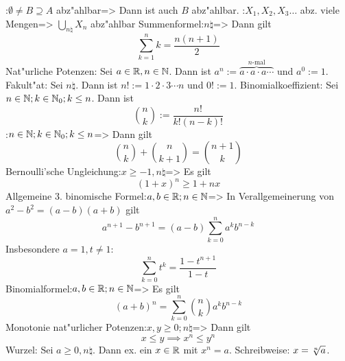 \theorem:$\emptyset\ne B\supseteq A$ abz"ahlbar=>{
  Dann ist auch $B$ abz"ahlbar.
  }
\theorem:$X_1,X_2,X_3\ldots$ abz. viele Mengen=>{
  $\bigcup\limits_{n\natural} X_n$ abz"ahlbar
  }
\theorem Summenformel:$n\natural$=>{
  Dann gilt
  \[\sum_{k=1}^n k=\frac{n(n+1)}2
    \]
  }
 Nat"urliche Potenzen:{
  Sei $a\in\mathbb R,n\in\mathbb N$.
  Dann ist $a^n:=\overbrace{a\cdot a\cdot a\cdots}^{n\text{-mal}}$ und $a^0:=1$.
}
 Fakult"at:{
  Sei $n\natural$. Dann ist $n!:=1\cdot 2\cdot 3\cdots n$ und $0!:=1$.
}
 Binomialkoeffizient:{
  Sei $n\in\mathbb N;k\in\mathbb N_0;k\le n$. Dann ist 
  \[\binom n k :=\frac{n!}{k!(n-k)!}
    \]
}
\theorem:$n\in\mathbb N;k\in\mathbb N_0;k\le n$=>{
  Dann gilt
  \[\binom n k +\binom n {k+1}=\binom{n+1} k
    \]
  }
\theorem Bernoulli'sche Ungleichung:$x\ge -1,n\natural$=>{
  Es gilt
  \[(1+x)^n\ge 1+nx
    \]
  }
\theorem Allgemeine 3. binomische Formel:$a,b\in\mathbb R;n\in\mathbb N$=>{
  In Verallgemeinerung von $a^2-b^2=(a-b)(a+b)$ gilt
  \[a^{n+1}-b^{n+1}=(a-b)\sum_{k=0}^{n}a^kb^{n-k}
    \]
  Insbesondere $a=1,t\ne 1$:
  \[\sum_{k=0}^{n}t^k=\frac{1-t^{n+1}}{1-t}
    \]
}
\theorem Binomialformel:$a,b\in\mathbb R;n\in\mathbb N$=>{
  Es gilt
  \[(a+b)^n=\sum_{k=0}^n{n\choose k}a^kb^{n-k}
    \]
}
\lessertheorem Monotonie nat"urlicher Potenzen:$x,y\ge 0;n\natural$=>{
  Dann gilt 
  \[x\le y\implies x^n\le y^n
    \]
  }
 Wurzel:{
  Sei $a\ge 0,n\natural$. Dann ex. ein $x\in\mathbb R$ mit $x^n=a$.
  Schreibweise: $x=\root n \of a$.
  }
